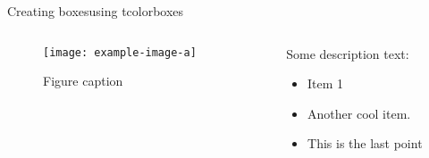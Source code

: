 \documentclass[aspectratio=169]{beamer}
\begin{document}
\begin{frame}{Creating boxes}{using tcolorboxes}


\begin{columns}
\begin{column}{.5\textwidth}

\begin{figure}
\centering
\texttt{[image: example-image-a]}
\caption{Figure caption}
\end{figure}

\end{column}
\begin{column}{.5\textwidth}

\begin{tcolorbox}
[colframe=eira_blue,
colback=eira_blue!10,
coltitle=white,
title= Box Title]

Some description text:

\begin{itemize}
\item Item 1
\item Another cool item.
\item This is the last point
\end{itemize}

\end{tcolorbox}

\end{column}
\end{columns}
\end{frame}

\end{document}
